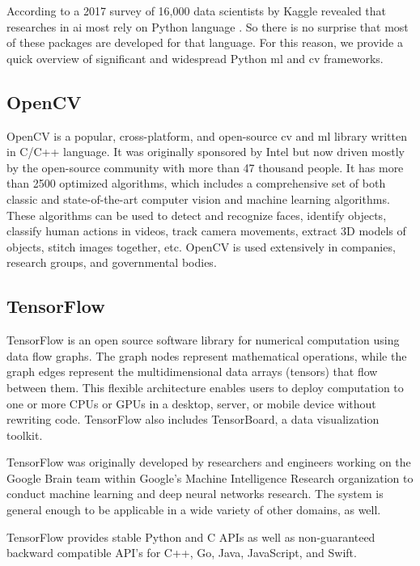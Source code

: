     According to a 2017 survey of 16,000 data scientists by Kaggle revealed that researches in  \gls{ai} most rely on Python language \cite{mostuseddatasciencetools}. So there is no surprise that most of these packages are developed for that language. For this reason, we provide a quick overview of significant and widespread Python \gls{ml} and \gls{cv} frameworks.
    
    \subsection{OpenCV}
        OpenCV \cite{opencv_library} is a popular, cross-platform, and open-source \gls{cv} and \gls{ml} library written in C/C++ language. It was originally sponsored by Intel but now driven mostly by the open-source community with more than 47 thousand people. It has more than 2500 optimized algorithms, which includes a comprehensive set of both classic and state-of-the-art computer vision and machine learning algorithms. These algorithms can be used to detect and recognize faces, identify objects, classify human actions in videos, track camera movements, extract 3D models of objects, stitch images together, etc. OpenCV is used extensively in companies, research groups, and governmental bodies. 
        
    \subsection{TensorFlow}
        TensorFlow \cite{abadi2016tensorflow} is an open source software library for numerical computation using data flow graphs. The graph nodes represent mathematical operations, while the graph edges represent the multidimensional data arrays (tensors) that flow between them. This flexible architecture enables users to deploy computation to one or more CPUs or GPUs in a desktop, server, or mobile device without rewriting code. TensorFlow also includes TensorBoard, a data visualization toolkit.

        TensorFlow was originally developed by researchers and engineers working on the Google Brain team within Google's Machine Intelligence Research organization to conduct machine learning and deep neural networks research. The system is general enough to be applicable in a wide variety of other domains, as well.

        TensorFlow provides stable Python and C APIs as well as non-guaranteed backward compatible API's for C++, Go, Java, JavaScript, and Swift. 
        
